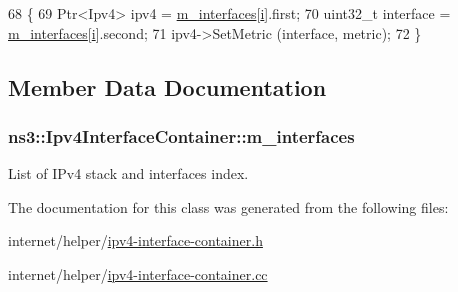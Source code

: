 \begin{DoxyCode}
68 \{
69   Ptr<Ipv4> ipv4 = \hyperlink{classns3_1_1Ipv4InterfaceContainer_ad24e1d0f593229265cf2a27a06c16329}{m\_interfaces}[\hyperlink{bernuolliDistribution_8m_a6f6ccfcf58b31cb6412107d9d5281426}{i}].first;
70   uint32\_t \textcolor{keyword}{interface }= \hyperlink{classns3_1_1Ipv4InterfaceContainer_ad24e1d0f593229265cf2a27a06c16329}{m\_interfaces}[\hyperlink{bernuolliDistribution_8m_a6f6ccfcf58b31cb6412107d9d5281426}{i}].second;
71   ipv4->SetMetric (interface, metric);
72 \}
\end{DoxyCode}


\subsection{Member Data Documentation}
\subsubsection[{\texorpdfstring{m\+\_\+interfaces}{m_interfaces}}]{ ns3\+::\+Ipv4\+Interface\+Container\+::m\+\_\+interfaces\hspace{0.3cm}{\ttfamily [private]}}\hypertarget{classns3_1_1Ipv4InterfaceContainer_ad24e1d0f593229265cf2a27a06c16329}{}\label{classns3_1_1Ipv4InterfaceContainer_ad24e1d0f593229265cf2a27a06c16329}


List of I\+Pv4 stack and interfaces index. 



The documentation for this class was generated from the following files\+:\begin{DoxyCompactItemize}
\item 
internet/helper/\hyperlink{ipv4-interface-container_8h}{ipv4-\/interface-\/container.\+h}\item 
internet/helper/\hyperlink{ipv4-interface-container_8cc}{ipv4-\/interface-\/container.\+cc}\end{DoxyCompactItemize}
